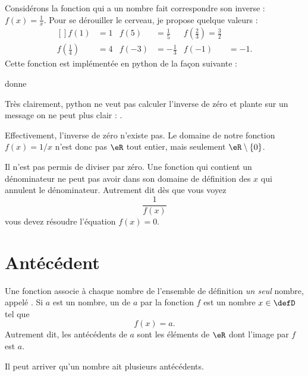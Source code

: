 \begin{example}
    Considérons la fonction qui a un nombre fait correspondre son inverse : \( f(x)=\frac{1}{ x }\). Pour se dérouiller le cerveau, je propose quelque valeurs :
    \begin{equation}
        \begin{aligned}[]
            f(1)&=1&f(5)&=\frac{1}{ 5 }&f(\frac{ 2 }{ 3 })=\frac{ 3 }{ 2 }\\
            f(\frac{ 1 }{ 4 })&=4&f(-3)&=-\frac{1}{ 3 }&f(-1)&=-1.
        \end{aligned}
    \end{equation}
    Cette fonction est implémentée en python de la façon suivante :



donne



Très clairement, python ne veut pas calculer l'inverse de zéro et plante sur un message on ne peut plus clair : .

Effectivement, l'inverse de zéro n'existe pas. Le domaine de notre fonction \( f(x)=1/x\) n'est donc pas \( \eR\) tout entier, mais seulement \( \eR\setminus\{ 0 \}\).

\end{example}

\begin{Aretenir}        \label{ArtJgipNt}
    Il n'est pas permis de diviser par zéro. Une fonction qui contient un dénominateur ne peut pas avoir dans son domaine de définition des \( x\) qui annulent le dénominateur. Autrement dit dès que vous voyez
    \begin{equation}
        \frac{1}{ f(x) }
    \end{equation}
    vous devez résoudre l'équation \( f(x)=0\).
\end{Aretenir}

\section{Antécédent}

\begin{Aretenir}
Une fonction associe à chaque nombre de l'ensemble de définition \emph{un seul} nombre, appelé . Si \( a\) est un nombre, un  de \( a\) par la fonction \( f\) est un nombre \( x\in\defD\) tel que 
\begin{equation}
    f(x)=a.
\end{equation}
Autrement dit, les antécédents de \( a\) sont les éléments de \( \eR\) dont l'image par \( f\) est \( a\).

Il peut arriver qu'un nombre ait plusieurs antécédents.
\end{Aretenir}


